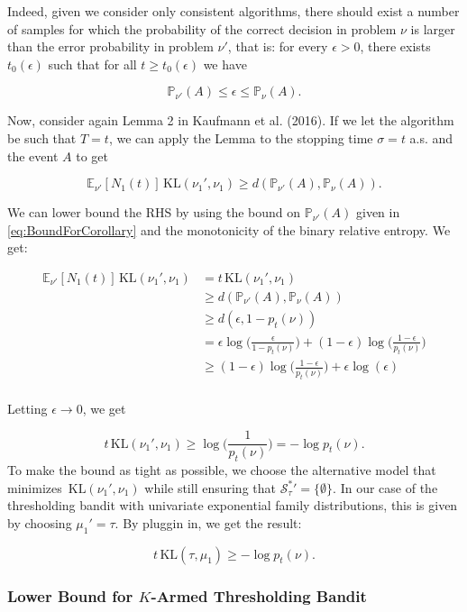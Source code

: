 \documentclass[11pt,]{article}
\newcommand{\KL}{\,\text{KL}}
\begin{document}
Indeed, given we consider only consistent algorithms, there should exist
a number of samples for which the probability of the correct decision in
problem \(\nu\) is larger than the error probability in problem
\(\nu'\), that is: for every \(\epsilon > 0\), there exists
\(t_0(\epsilon)\) such that for all \(t \geq t_0(\epsilon)\) we have

\begin{equation*}
\mathbb{P}_{\nu'}(A) \leq \epsilon \leq \mathbb{P}_{\nu}(A). \label{eq:BoundForCorollary}
\end{equation*}

Now, consider again Lemma 2 in Kaufmann et al. (2016). If we let the
algorithm be such that \(T = t\), we can apply the Lemma to the stopping
time \(\sigma = t\) a.s. and the event \(A\) to get

\[
\mathbb{E}_{\nu'}[N_1(t)]\KL(\nu_1', \nu_1) \geq d(\mathbb{P}_{\nu'}(A), \mathbb{P}_{\nu}(A)).
\]

We can lower bound the RHS by using the bound on
\(\mathbb{P}_{\nu'}(A)\) given in \eqref{eq:BoundForCorollary} and the
monotonicity of the binary relative entropy. We get:

\begin{align*}
\mathbb{E}_{\nu'}[N_1(t)]\KL(\nu_1', \nu_1) & = t \KL(\nu_1', \nu_1) \\
& \geq d(\mathbb{P}_{\nu'}(A), \mathbb{P}_{\nu}(A)) \\
& \geq d(\epsilon, 1- p_t(\nu)) \\
& = \epsilon \log\Big(\frac{\epsilon}{1-p_t(\nu)}\Big) + (1-\epsilon) \log \Big(\frac{1-\epsilon}{p_t(\nu)}\Big) \\
& \geq (1-\epsilon) \log \Big(\frac{1-\epsilon}{p_t(\nu)}\Big) + \epsilon \log(\epsilon) \\
\end{align*}

Letting \(\epsilon \rightarrow 0\), we get

\[
t \KL(\nu_1', \nu_1) \geq \log \Big(\frac{1}{p_t(\nu)}\Big) = -\log p_t(\nu).
\] To make the bound as tight as possible, we choose the alternative
model that minimizes \(\KL(\nu_1', \nu_1)\) while still ensuring that
\(\mathcal{S}_{\tau}^* {'} = \{\emptyset\}\). In our case of the
thresholding bandit with univariate exponential family distributions,
this is given by choosing \(\mu_1' = \tau\). By pluggin in, we get the
result:

\[
t \KL(\tau, \mu_1) \geq -\log p_t(\nu).
\]

\subsubsection{\texorpdfstring{Lower Bound for \(K\)-Armed Thresholding
Bandit
\label{sec:corollaryLBKTBPproof}}{Lower Bound for K-Armed Thresholding Bandit }}\label{lower-bound-for-k-armed-thresholding-bandit}
\end{document}

